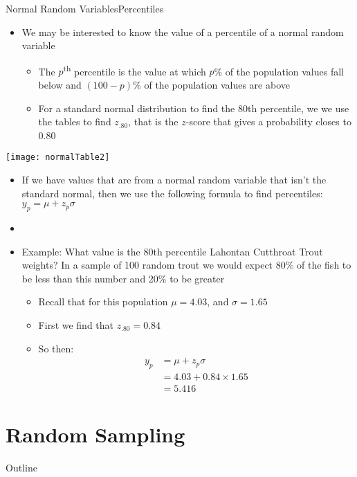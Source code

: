 \documentclass[xcolor=dvipsnames]{beamer}
\begin{document}
\begin{frame}{Normal Random Variables}{Percentiles}
	\begin{itemize}
		\item We may be interested to know the value of a percentile of a normal random variable
		\begin{itemize}
			\item The $p$\textsuperscript{th} percentile is the value at which $p$\% of the population values fall below and $(100-p)$\% of the population values are above
			\item For a standard normal distribution to find the 80th percentile, we we use the tables to find $z_{.80}$, that is the $z$-score that gives a probability closes to 0.80
		\end{itemize}
	\end{itemize}
	\begin{center}
		\texttt{[image: normalTable2]}
	\end{center}
\end{frame}

\begin{frame}
	\begin{itemize}
		\item If we have values that are from a normal random variable that isn't the standard normal, then we use the following formula to find percentiles: $y_p = \mu + z_p \sigma$
		\item[]
		\item Example: What value is the 80th percentile Lahontan Cutthroat Trout weights? In a sample of 100 random trout we would expect 80\% of the fish to be less than this number and 20\% to be greater
		\begin{itemize}
			\item Recall that for this population $\mu = 4.03$, and $\sigma = 1.65$
			\item First we find that $z_{.80} = 0.84$
			\item So then:
			\begin{align*}
				y_p &= \mu + z_p \sigma \\
				&= 4.03 + 0.84 \times 1.65 \\
				&= 5.416
			\end{align*}
		\end{itemize}
	\end{itemize}
\end{frame}

\section{Random Sampling}
\begin{frame}{Outline}
	\tableofcontents[currentsection,subsectionstyle=show/shaded/hide]
\end{frame}
\end{document}
